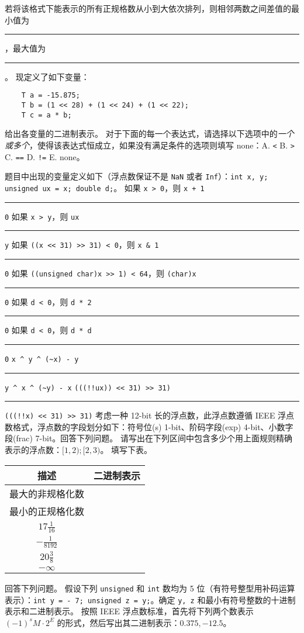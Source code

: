 \begin{problems}
			\qn 若将该格式下能表示的所有正规格数从小到大依次排列，则相邻两数之间差值的最小值为 \rule{2.5cm}{0.25mm}，最大值为 \rule{2.5cm}{0.25mm}。
			\qn 现定义了如下变量：
			\begin{verbatim}
    T a = -15.875;
    T b = (1 << 28) + (1 << 24) + (1 << 22);
    T c = a * b;
			\end{verbatim}
			给出各变量的二进制表示。
		 对于下面的每一个表达式，请选择以下选项中的\emph{一个或多个}，使得该表达式恒成立，如果没有满足条件的选项则填写 none：A. \texttt{<} \quad B. \texttt{>} \quad C. \texttt{==} \quad D. \texttt{!=} \quad E. none。
		
		题目中出现的变量定义如下（浮点数保证不是 \texttt{NaN} 或者 \texttt{Inf}）：\texttt{int x, y; unsigned ux = x; double d;}。
		\qn 如果 \texttt{x > 0}，则 \texttt{x + 1} \rule{2.5cm}{0.25mm} \texttt{0}
		\qn 如果 \texttt{x > y}，则 \texttt{ux} \rule{2.5cm}{0.25mm} \texttt{y}
		\qn 如果 \verb|((x << 31) >> 31) < 0|，则 \verb|x & 1| \rule{2.5cm}{0.25mm} \texttt{0}
		\qn 如果 \verb|((unsigned char)x >> 1) < 64|，则 \texttt{(char)x} \rule{2.5cm}{0.25mm} \texttt{0}
		\qn 如果 \texttt{d < 0}，则 \texttt{d * 2} \rule{2.5cm}{0.25mm} \texttt{0}
		\qn 如果 \texttt{d < 0}，则 \texttt{d * d} \rule{2.5cm}{0.25mm} \texttt{0}
		\qn \verb|x ^ y ^ (~x) - y| \rule{2.5cm}{0.25mm} \verb|y ^ x ^ (~y) - x|
		\qn \verb|(((!!ux)) << 31) >> 31)| \rule{2.5cm}{0.25mm} \verb|(((!!x) << 31) >> 31)|
		 考虑一种 12-bit 长的浮点数，此浮点数遵循 IEEE 浮点数格式，浮点数的字段划分如下：符号位(s) 1-bit、阶码字段(exp) 4-bit、小数字段(frac) 7-bit。回答下列问题。
			\qn 请写出在下列区间中包含多少个用上面规则精确表示的浮点数：$[1, 2); [2, 3)$。
			\qn 填写下表。
			\begin{table}[H]
				\centering
				\begin{tabular}{|c|c|}
					\hline
					描述 & 二进制表示 \\ \hline
					最大的非规格化数 & {\qquad \qquad \qquad \qquad} \\ \hline
					最小的正规格化数 & {\qquad \qquad \qquad \qquad} \\ \hline
					$17 \frac{1}{16}$ & {\qquad \qquad \qquad \qquad} \\ \hline
					$-\frac{1}{8192}$ & {\qquad \qquad \qquad \qquad} \\ \hline
					$20 \frac{3}{8}$ & {\qquad \qquad \qquad \qquad} \\ \hline
					$-\infty$ & {\qquad \qquad \qquad \qquad} \\ \hline
				\end{tabular}
			\end{table}
		 回答下列问题。
			\qn 假设下列 \texttt{unsigned} 和 \texttt{int} 数均为 5 位（有符号整型用补码运算表示）：\texttt{int y = - 7; unsigned z = y;}。确定 \texttt{y, z} 和最小有符号整数的十进制表示和二进制表示。
			\qn 按照 IEEE 浮点数标准，首先将下列两个数表示 $(-1)^sM \cdot 2^E$ 的形式，然后写出其二进制表示：$0.375, -12.5$。
	\end{problems}